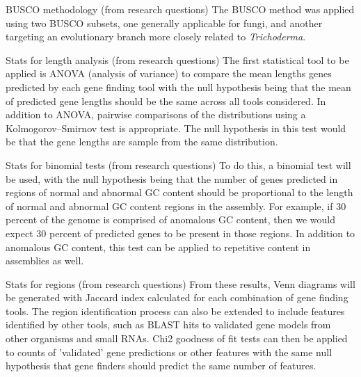 BUSCO methodology (from research questions)
The BUSCO method was applied using two BUSCO subsets,
one generally applicable for fungi, and another targeting an
evolutionary branch more closely related to \textit{Trichoderma}.

Stats for length analysis (from research questions)
The first statistical tool to be applied is ANOVA (analysis of
variance) to compare the mean lengths genes predicted by each gene
finding tool with the null hypothesis being that the mean of predicted
gene lengths should be the same across all tools considered. In
addition to ANOVA, pairwise comparisons of the distributions using a
Kolmogorov–Smirnov test is appropriate. The null hypothesis in this
test would be that the gene lengths are sample from the same
distribution.

Stats for binomial tests (from research questions)
To do this, a binomial test will be used, with the null hypothesis
being that the number of genes predicted in regions of normal and
abnormal GC content should be proportional to the length of normal and
abnormal GC content regions in the assembly. For example, if 30
percent of the genome is comprised of anomalous GC content, then we
would expect 30 percent of predicted genes to be present in those
regions. In addition to anomalous GC content, this test can be applied
to repetitive content in assemblies as well.

Stats for regions (from research questions)
From these results, Venn diagrams will be generated with
Jaccard index calculated for each combination of gene finding
tools. The region identification process can also be extended to
include features identified by other tools, such as BLAST hits to
validated gene models from other organisms and small RNAs. Chi2
goodness of fit tests can then be applied to counts of 'validated'
gene predictions or other features with the same null hypothesis that
gene finders should predict the same number of features.

